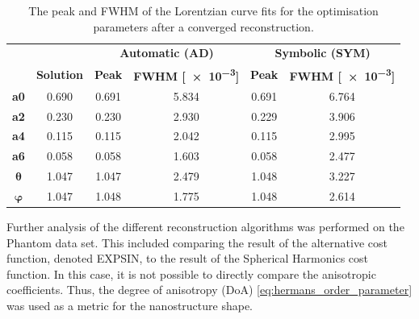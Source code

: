 \begin{table}[h!]
    \centering
    \caption[Peak and FWHM of Lorentzian Curve Fit]{  The peak and FWHM of the Lorentzian curve fits
        for the optimisation parameters after a converged reconstruction.}
    \label{tab:curve_fitting}
    \begin{tabular}{ c c c c c c }
        \hline %
        \textbf{}      &                   & \multicolumn{2}{c}{\textbf{Automatic (AD)}} & \multicolumn{2}{c}{\textbf{Symbolic (SYM)}}                                             \\
        \textbf{}      & \textbf{Solution} & \textbf{Peak}                               & \textbf{FWHM [\num{e-3}]}                   & \textbf{Peak} & \textbf{FWHM [\num{e-3}]} \\
        \hline %
        \textbf{a0}    & 0.690             & 0.691                                       & 5.834                                       & 0.691         & 6.764                     \\
        \textbf{a2}    & 0.230             & 0.230                                       & 2.930                                       & 0.229         & 3.906                     \\
        \textbf{a4}    & 0.115             & 0.115                                       & 2.042                                       & 0.115         & 2.995                     \\
        \textbf{a6}    & 0.058             & 0.058                                       & 1.603                                       & 0.058         & 2.477                     \\
        $\bm{\theta}$  & 1.047             & 1.047                                       & 2.479                                       & 1.048         & 3.227                     \\
        $\bm{\varphi}$ & 1.047             & 1.048                                       & 1.775                                       & 1.048         & 2.614                     \\
        \hline %
    \end{tabular}
\end{table}

\clearpage

Further analysis of the different reconstruction algorithms was performed on the Phantom data set.
This included comparing the result of the alternative cost function, denoted EXPSIN, to the result of the Spherical Harmonics cost function.
In this case, it is not possible to directly compare the anisotropic coefficients. Thus, the degree of anisotropy (DoA) \eqref{eq:hermans_order_parameter} was used as a metric for the nanostructure shape.

